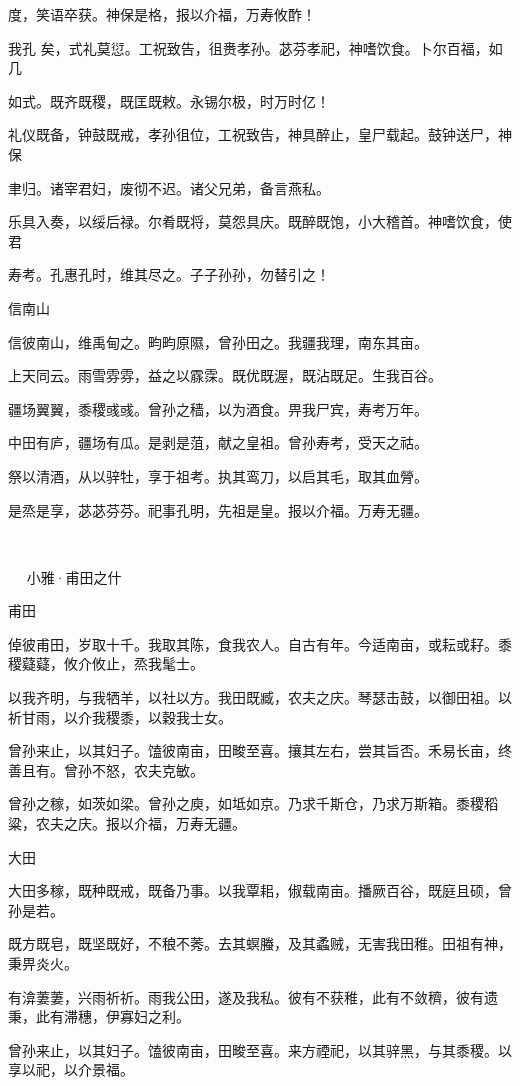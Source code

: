 度，笑语卒获。神保是格，报以介福，万寿攸酢！

我孔 矣，式礼莫愆。工祝致告，徂赉孝孙。苾芬孝祀，神嗜饮食。卜尔百福，如几

如式。既齐既稷，既匡既敕。永锡尔极，时万时亿！

礼仪既备，钟鼓既戒，孝孙徂位，工祝致告，神具醉止，皇尸载起。鼓钟送尸，神保

聿归。诸宰君妇，废彻不迟。诸父兄弟，备言燕私。

乐具入奏，以绥后禄。尔肴既将，莫怨具庆。既醉既饱，小大稽首。神嗜饮食，使君

寿考。孔惠孔时，维其尽之。子子孙孙，勿替引之！

信南山

信彼南山，维禹甸之。畇畇原隰，曾孙田之。我疆我理，南东其亩。

上天同云。雨雪雰雰，益之以霡霂。既优既渥，既沾既足。生我百谷。

疆场翼翼，黍稷彧彧。曾孙之穑，以为酒食。畀我尸宾，寿考万年。

中田有庐，疆场有瓜。是剥是菹，献之皇祖。曾孙寿考，受天之祜。

祭以清酒，从以骍牡，享于祖考。执其鸾刀，以启其毛，取其血膋。

是烝是享，苾苾芬芬。祀事孔明，先祖是皇。报以介福。万寿无疆。

　

　
小雅·甫田之什


甫田 

倬彼甫田，岁取十千。我取其陈，食我农人。自古有年。今适南亩，或耘或耔。黍稷薿薿，攸介攸止，烝我髦士。

以我齐明，与我牺羊，以社以方。我田既臧，农夫之庆。琴瑟击鼓，以御田祖。以祈甘雨，以介我稷黍，以穀我士女。

曾孙来止，以其妇子。馌彼南亩，田畯至喜。攘其左右，尝其旨否。禾易长亩，终善且有。曾孙不怒，农夫克敏。

曾孙之稼，如茨如梁。曾孙之庾，如坻如京。乃求千斯仓，乃求万斯箱。黍稷稻粱，农夫之庆。报以介福，万寿无疆。

大田

大田多稼，既种既戒，既备乃事。以我覃耜，俶载南亩。播厥百谷，既庭且硕，曾孙是若。

既方既皂，既坚既好，不稂不莠。去其螟螣，及其蟊贼，无害我田稚。田祖有神，秉畀炎火。

有渰萋萋，兴雨祈祈。雨我公田，遂及我私。彼有不获稚，此有不敛穧，彼有遗秉，此有滞穗，伊寡妇之利。

曾孙来止，以其妇子。馌彼南亩，田畯至喜。来方禋祀，以其骍黑，与其黍稷。以享以祀，以介景福。

